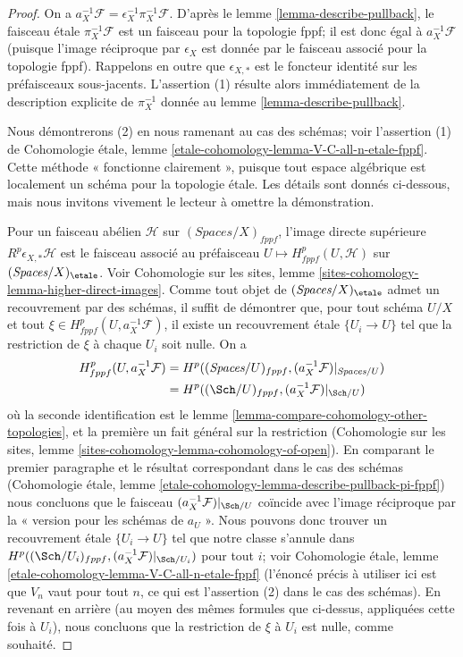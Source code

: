 \begin{proof}
On a $a_X^{-1}\mathcal{F} = \epsilon_X^{-1} \pi_X^{-1}\mathcal{F}$.
D'après le lemme \ref{lemma-describe-pullback}, le faisceau étale
$\pi_X^{-1}\mathcal{F}$ est un faisceau pour la topologie fppf; il est donc
égal à $a_X^{-1}\mathcal{F}$ (puisque l'image réciproque par $\epsilon_X$
est donnée par le faisceau associé pour la topologie fppf).
Rappelons en outre que $\epsilon_{X, *}$ est le foncteur identité
sur les préfaisceaux sous-jacents.
L'assertion (1) résulte alors immédiatement de la description explicite de
$\pi_X^{-1}$ donnée au lemme \ref{lemma-describe-pullback}.

\medskip\noindent
Nous démontrerons (2) en nous ramenant au cas des schémas; voir l'assertion (1)
de Cohomologie étale, lemme
\ref{etale-cohomology-lemma-V-C-all-n-etale-fppf}.
Cette méthode « fonctionne clairement », puisque tout espace algébrique est
localement un schéma pour la topologie étale. Les détails sont donnés ci-dessous,
mais nous invitons vivement le lecteur à omettre la démonstration.

\medskip\noindent
Pour un faisceau abélien $\mathcal{H}$ sur $(\textit{Spaces}/X)_{fppf}$,
l'image directe supérieure $R^p\epsilon_{X, *}\mathcal{H}$ est le faisceau
associé au préfaisceau $U \mapsto H^p_{fppf}(U, \mathcal{H})$
sur $(\textit{Spaces}/X)_\etale$. Voir Cohomologie sur les sites, lemme
\ref{sites-cohomology-lemma-higher-direct-images}.
Comme tout objet de $(\textit{Spaces}/X)_\etale$ admet un recouvrement par des
schémas, il suffit de démontrer que, pour tout schéma $U/X$ et tout
$\xi \in H^p_{fppf}(U, a_X^{-1}\mathcal{F})$, il existe un recouvrement étale
$\{U_i \to U\}$ tel que la restriction de $\xi$ à chaque $U_i$ soit nulle.
On a
\begin{align*}
H^p_{fppf}(U, a_X^{-1}\mathcal{F})
& =
H^p((\textit{Spaces}/U)_{fppf}, (a_X^{-1}\mathcal{F})|_{\textit{Spaces}/U}) \\
& =
H^p((\Sch/U)_{fppf}, (a_X^{-1}\mathcal{F})|_{\Sch/U})
\end{align*}
où la seconde identification est le lemme
\ref{lemma-compare-cohomology-other-topologies}, et la première un fait général
sur la restriction (Cohomologie sur les sites, lemme
\ref{sites-cohomology-lemma-cohomology-of-open}).
En comparant le premier paragraphe et le résultat correspondant dans le cas
des schémas (Cohomologie étale, lemme
\ref{etale-cohomology-lemma-describe-pullback-pi-fppf})
nous concluons que le faisceau $(a_X^{-1}\mathcal{F})|_{\Sch/U}$
coïncide avec l'image réciproque par la « version pour les schémas de $a_U$ ».
Nous pouvons donc trouver un recouvrement étale $\{U_i \to U\}$ tel que notre
classe s'annule dans
$H^p((\Sch/U_i)_{fppf}, (a_X^{-1}\mathcal{F})|_{\Sch/U_i})$
pour tout $i$; voir Cohomologie étale, lemme
\ref{etale-cohomology-lemma-V-C-all-n-etale-fppf}
(l'énoncé précis à utiliser ici est que $V_n$ vaut pour tout $n$, ce qui est
l'assertion (2) dans le cas des schémas).
En revenant en arrière (au moyen des mêmes formules que ci-dessus, appliquées
cette fois à $U_i$), nous concluons que la restriction de $\xi$ à $U_i$
est nulle, comme souhaité.
\end{proof}

